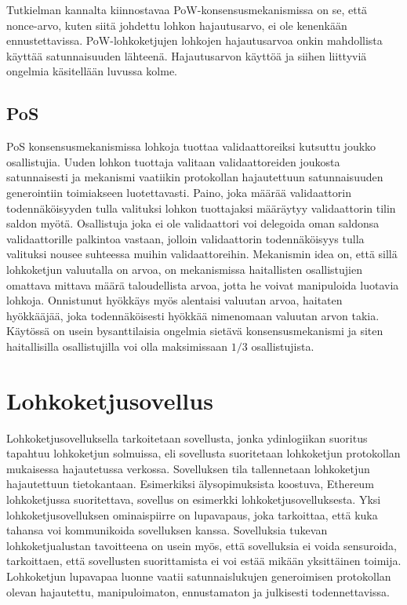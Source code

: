 Tutkielman kannalta kiinnostavaa PoW-konsensusmekanismissa on se, että nonce-arvo, kuten siitä johdettu lohkon hajautusarvo, ei ole kenenkään ennustettavissa. PoW-lohkoketjujen lohkojen hajautusarvoa onkin mahdollista käyttää satunnaisuuden lähteenä. Hajautusarvon käyttöä ja siihen liittyviä ongelmia käsitellään luvussa kolme.

\subsection{PoS}

PoS konsensusmekanismissa lohkoja tuottaa validaattoreiksi kutsuttu joukko osallistujia. Uuden lohkon tuottaja valitaan validaattoreiden joukosta satunnaisesti ja mekanismi vaatiikin protokollan hajautettuun satunnaisuuden generointiin toimiakseen luotettavasti. Paino, joka määrää validaattorin todennäköisyyden tulla valituksi lohkon tuottajaksi määräytyy validaattorin tilin saldon myötä. Osallistuja joka ei ole validaattori voi delegoida oman saldonsa validaattorille palkintoa vastaan, jolloin validaattorin todennäköisyys tulla valituksi nousee suhteessa muihin validaattoreihin. Mekanismin idea on, että sillä lohkoketjun valuutalla on arvoa, on mekanismissa haitallisten osallistujien omattava mittava määrä taloudellista arvoa, jotta he voivat manipuloida luotavia lohkoja. Onnistunut hyökkäys myös alentaisi valuutan arvoa, haitaten hyökkääjää, joka todennäköisesti hyökkää nimenomaan valuutan arvon takia. Käytössä on usein bysanttilaisia ongelmia sietävä konsensusmekanismi ja siten haitallisilla osallistujilla voi olla maksimissaan $1/3$ osallistujista.

\section{Lohkoketjusovellus}

Lohkoketjusovelluksella tarkoitetaan sovellusta, jonka ydinlogiikan suoritus tapahtuu lohkoketjun solmuissa, eli sovellusta suoritetaan lohkoketjun protokollan mukaisessa hajautetussa verkossa. Sovelluksen tila tallennetaan lohkoketjun hajautettuun tietokantaan. Esimerkiksi älysopimuksista koostuva, Ethereum\cite{ethereum_foundation_ethereum_nodate}
 lohkoketjussa suoritettava, sovellus on esimerkki lohkoketjusovelluksesta. Yksi lohkoketjusovelluksen ominaispiirre on lupavapaus, joka tarkoittaa, että kuka tahansa voi kommunikoida sovelluksen kanssa. Sovelluksia tukevan lohkoketjualustan tavoitteena on usein myös, että sovelluksia ei voida sensuroida, tarkoittaen, että sovellusten suorittamista ei voi estää mikään yksittäinen toimija.
Lohkoketjun lupavapaa luonne vaatii satunnaislukujen generoimisen protokollan olevan hajautettu, manipuloimaton, ennustamaton ja julkisesti todennettavissa.

